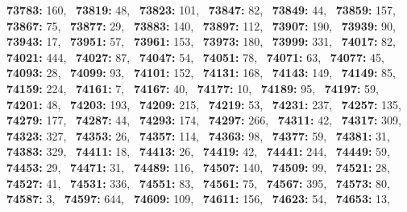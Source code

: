 \textbf{73783:} 160,\allowbreak~ 
\textbf{73819:} 48,\allowbreak~ 
\textbf{73823:} 101,\allowbreak~ 
\textbf{73847:} 82,\allowbreak~ 
\textbf{73849:} 44,\allowbreak~ 
\textbf{73859:} 157,\allowbreak~ 
\textbf{73867:} 75,\allowbreak~ 
\textbf{73877:} 29,\allowbreak~ 
\textbf{73883:} 140,\allowbreak~ 
\textbf{73897:} 112,\allowbreak~ 
\textbf{73907:} 190,\allowbreak~ 
\textbf{73939:} 90,\allowbreak~ 
\textbf{73943:} 17,\allowbreak~ 
\textbf{73951:} 57,\allowbreak~ 
\textbf{73961:} 153,\allowbreak~ 
\textbf{73973:} 180,\allowbreak~ 
\textbf{73999:} 331,\allowbreak~ 
\textbf{74017:} 82,\allowbreak~ 
\textbf{74021:} 444,\allowbreak~ 
\textbf{74027:} 87,\allowbreak~ 
\textbf{74047:} 54,\allowbreak~ 
\textbf{74051:} 78,\allowbreak~ 
\textbf{74071:} 63,\allowbreak~ 
\textbf{74077:} 45,\allowbreak~ 
\textbf{74093:} 28,\allowbreak~ 
\textbf{74099:} 93,\allowbreak~ 
\textbf{74101:} 152,\allowbreak~ 
\textbf{74131:} 168,\allowbreak~ 
\textbf{74143:} 149,\allowbreak~ 
\textbf{74149:} 85,\allowbreak~ 
\textbf{74159:} 224,\allowbreak~ 
\textbf{74161:} 7,\allowbreak~ 
\textbf{74167:} 40,\allowbreak~ 
\textbf{74177:} 10,\allowbreak~ 
\textbf{74189:} 95,\allowbreak~ 
\textbf{74197:} 59,\allowbreak~ 
\textbf{74201:} 48,\allowbreak~ 
\textbf{74203:} 193,\allowbreak~ 
\textbf{74209:} 215,\allowbreak~ 
\textbf{74219:} 53,\allowbreak~ 
\textbf{74231:} 237,\allowbreak~ 
\textbf{74257:} 135,\allowbreak~ 
\textbf{74279:} 177,\allowbreak~ 
\textbf{74287:} 44,\allowbreak~ 
\textbf{74293:} 174,\allowbreak~ 
\textbf{74297:} 266,\allowbreak~ 
\textbf{74311:} 42,\allowbreak~ 
\textbf{74317:} 309,\allowbreak~ 
\textbf{74323:} 327,\allowbreak~ 
\textbf{74353:} 26,\allowbreak~ 
\textbf{74357:} 114,\allowbreak~ 
\textbf{74363:} 98,\allowbreak~ 
\textbf{74377:} 59,\allowbreak~ 
\textbf{74381:} 31,\allowbreak~ 
\textbf{74383:} 329,\allowbreak~ 
\textbf{74411:} 18,\allowbreak~ 
\textbf{74413:} 26,\allowbreak~ 
\textbf{74419:} 42,\allowbreak~ 
\textbf{74441:} 244,\allowbreak~ 
\textbf{74449:} 59,\allowbreak~ 
\textbf{74453:} 29,\allowbreak~ 
\textbf{74471:} 31,\allowbreak~ 
\textbf{74489:} 116,\allowbreak~ 
\textbf{74507:} 140,\allowbreak~ 
\textbf{74509:} 99,\allowbreak~ 
\textbf{74521:} 28,\allowbreak~ 
\textbf{74527:} 41,\allowbreak~ 
\textbf{74531:} 336,\allowbreak~ 
\textbf{74551:} 83,\allowbreak~ 
\textbf{74561:} 75,\allowbreak~ 
\textbf{74567:} 395,\allowbreak~ 
\textbf{74573:} 80,\allowbreak~ 
\textbf{74587:} 3,\allowbreak~ 
\textbf{74597:} 644,\allowbreak~ 
\textbf{74609:} 109,\allowbreak~ 
\textbf{74611:} 156,\allowbreak~ 
\textbf{74623:} 54,\allowbreak~ 
\textbf{74653:} 13,\allowbreak~ 
